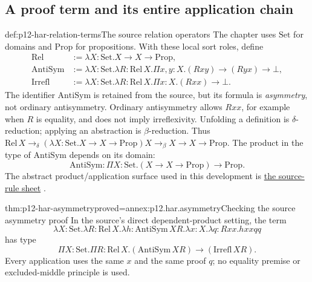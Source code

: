 \subsection{A proof term and its entire application chain}

\begin{hbdefinition}{def:p12-har-relation-terms}{The source relation operators}
The chapter uses \(\mathrm{Set}\) for domains and
\(\mathrm{Prop}\) for propositions. With these local sort roles, define
\[
\begin{aligned}
 \mathrm{Rel}&:=\lambda X:\mathrm{Set}.X\to X\to\mathrm{Prop},\\
 \mathrm{AntiSym}&:=\lambda X:\mathrm{Set}.\lambda R:\mathrm{Rel}\,X.
       \Pi x,y:X.(Rxy)\to(Ryx)\to\bot,\\
 \mathrm{Irrefl}&:=\lambda X:\mathrm{Set}.\lambda R:\mathrm{Rel}\,X.
       \Pi x:X.(Rxx)\to\bot.
\end{aligned}
\]
The identifier \(\mathrm{AntiSym}\) is retained from the source, but its
formula is \emph{asymmetry}, not ordinary antisymmetry. Ordinary
antisymmetry allows \(Rxx\), for example when \(R\) is equality, and
does not imply irreflexivity. Unfolding a definition is \(\delta\)-reduction;
applying an abstraction is \(\beta\)-reduction. Thus
\(\mathrm{Rel}\,X\to_\delta
(\lambda X:\mathrm{Set}.X\to X\to\mathrm{Prop})X
\to_\beta X\to X\to\mathrm{Prop}\).
The product in the type of \(\mathrm{AntiSym}\) depends on its domain:
\[
 \mathrm{AntiSym}:\Pi X:\mathrm{Set}.
       (X\to X\to\mathrm{Prop})\to\mathrm{Prop}.
\]
The abstract product/application surface used in this development is
\hyperref[sheet:p12-har-types]{the source-rule sheet}
\cite[pp.~1157--1158]{BarendregtGeuvers2001}.
\end{hbdefinition}

\begin{hbtheorem}{thm:p12-har-asymmetry}{proved=annex:p12.har.asymmetry}{Checking the source asymmetry proof}
In the source's direct dependent-product setting, the term
\[
 \lambda X:\mathrm{Set}.\lambda R:\mathrm{Rel}\,X.
 \lambda h:\mathrm{AntiSym}\,X R.\lambda x:X.\lambda q:Rxx.hxxqq
\]
has type
\[
 \Pi X:\mathrm{Set}.\Pi R:\mathrm{Rel}\,X.
       (\mathrm{AntiSym}\,X R)\to(\mathrm{Irrefl}\,X R).
\]
Every application uses the same \(x\) and the same proof \(q\); no
equality premise or excluded-middle principle is used.
\end{hbtheorem}

